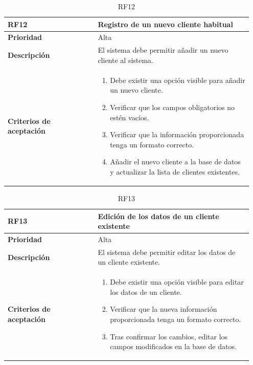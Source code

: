 \begin{table}[H]
	\centering %
	\begin{tabular}{|p{0.35\linewidth}|p{0.6\linewidth}|}
		\hline
		\rowcolor{grayshade} \textbf{RF12} & \textbf{Registro de un nuevo cliente habitual} \\
		\hline
		\textbf{Prioridad} & Alta \\
		\hline
		\textbf{Descripción} & El sistema debe permitir añadir un nuevo cliente al sistema.\\
		\hline
		\vspace{0.5mm}
		\textbf{Criterios de aceptación} & 
		\begin{minipage}[t]{0.9\linewidth}
			\begin{enumerate}
				\item Debe existir una opción visible para añadir un nuevo cliente. 
				\item Verificar que los campos obligatorios no estén vacíos. 
				\item Verificar que la información proporcionada tenga un formato correcto. 
				\item Añadir el nuevo cliente a la base de datos y actualizar la lista de clientes existentes. 
			\end{enumerate}
			\vspace{2mm}
		\end{minipage} \\
		\hline
	\end{tabular}
	\caption{RF12}
\end{table}

\begin{table}[H]
	\centering %
	\begin{tabular}{|p{0.35\linewidth}|p{0.6\linewidth}|}
		\hline
		\rowcolor{grayshade} \textbf{RF13} & \textbf{Edición de los datos de un cliente existente} \\
		\hline
		\textbf{Prioridad} & Alta \\
		\hline
		\textbf{Descripción} & El sistema debe permitir editar los datos de un cliente existente.\\
		\hline
		\vspace{0.5mm}
		\textbf{Criterios de aceptación} & 
		\begin{minipage}[t]{0.9\linewidth}
			\begin{enumerate}
				\item Debe existir una opción visible para editar los datos de un cliente. 
				\item Verificar que la nueva información proporcionada tenga un formato correcto. 
				\item Tras confirmar los cambios, editar los campos modificados en la base de datos.
			\end{enumerate}
			\vspace{2mm}
		\end{minipage} \\
		\hline
	\end{tabular}
	\caption{RF13}
\end{table}

